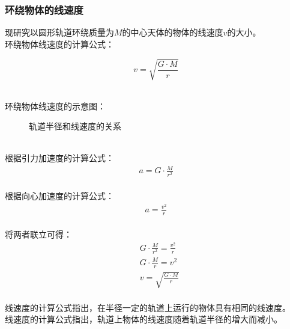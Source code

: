 \documentclass[UTF8]{ctexart}
\begin{document}
\subsubsection{环绕物体的线速度}
    \setcounter{equation}{0}
    现研究以圆形轨道环绕质量为$M$的中心天体的物体的线速度$v$的大小。\\[3mm]
    环绕物体线速度的计算公式：
    \begin{large}
        \begin{equation*}
            v=\sqrt{\frac{G\cdot M}{r}}
        \end{equation*}
    \end{large}\\
    环绕物体线速度的示意图：
    \begin{figure}[h]
        \begin{center}
            \caption{轨道半径和线速度的关系}
        \end{center}
    \end{figure}\\
    根据引力加速度的计算公式：
    \begin{align}
        a=G\cdot\frac{M}{r^2}
    \end{align}\\
    根据向心加速度的计算公式：
    \begin{align}
        a=\frac{v^2}{r}
    \end{align}\\
    将两者联立可得：
    \begin{align}
        &G\cdot\frac{M}{r^2}=\frac{v^2}{r}\\[3mm]
        &G\cdot\frac{M}{r}=v^2\\[3mm]
        &v=\sqrt{\frac{G\cdot M}{r}}
    \end{align}\\
    线速度的计算公式指出，在半径一定的轨道上运行的物体具有相同的线速度。\\[3mm]
    线速度的计算公式指出，轨道上物体的线速度随着轨道半径的增大而减小。
\end{document}
